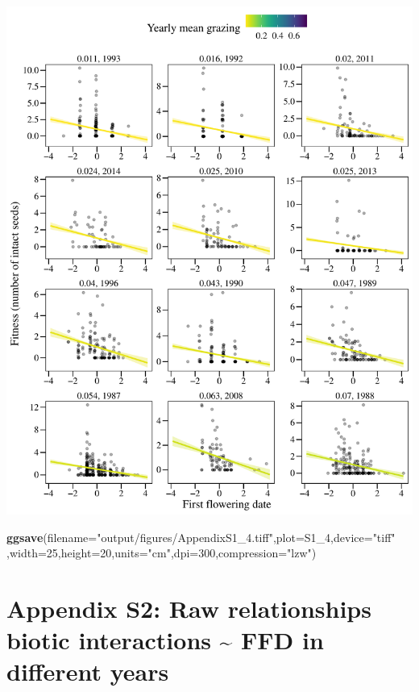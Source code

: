 \documentclass[
]{article}
\newenvironment{Shaded}{\begin{snugshade}}{\end{snugshade}}
\newcommand{\DataTypeTok}[1]{\textcolor[rgb]{0.13,0.29,0.53}{#1}}
\newcommand{\DecValTok}[1]{\textcolor[rgb]{0.00,0.00,0.81}{#1}}
\newcommand{\KeywordTok}[1]{\textcolor[rgb]{0.13,0.29,0.53}{\textbf{#1}}}
\newcommand{\NormalTok}[1]{#1}
\newcommand{\StringTok}[1]{\textcolor[rgb]{0.31,0.60,0.02}{#1}}
\begin{document}
\includegraphics{lathyrus_ms3_3_after_rev_Ecology_files/figure-latex/unnamed-chunk-71-1.pdf}

\begin{Shaded}
\begin{Highlighting}[]
\KeywordTok{ggsave}\NormalTok{(}\DataTypeTok{filename=}\StringTok{"output/figures/AppendixS1\_4.tiff"}\NormalTok{,}\DataTypeTok{plot=}\NormalTok{S1\_}\DecValTok{4}\NormalTok{,}\DataTypeTok{device=}\StringTok{"tiff"}
\NormalTok{       ,}\DataTypeTok{width=}\DecValTok{25}\NormalTok{,}\DataTypeTok{height=}\DecValTok{20}\NormalTok{,}\DataTypeTok{units=}\StringTok{"cm"}\NormalTok{,}\DataTypeTok{dpi=}\DecValTok{300}\NormalTok{,}\DataTypeTok{compression=}\StringTok{"lzw"}\NormalTok{)}
\end{Highlighting}
\end{Shaded}

\hypertarget{appendix-s2-raw-relationships-biotic-interactions-ffd-in-different-years}{%
\section{Appendix S2: Raw relationships biotic interactions
\textasciitilde{} FFD in different
years}\label{appendix-s2-raw-relationships-biotic-interactions-ffd-in-different-years}}
\end{document}
